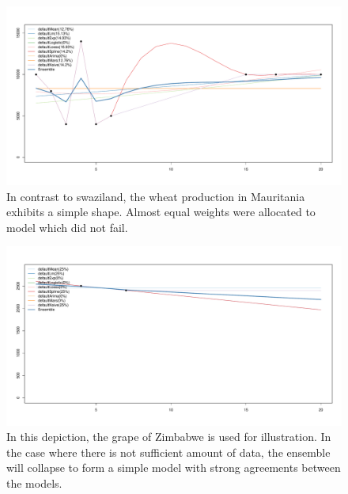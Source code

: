 \documentclass[nojss]{jss}\usepackage[]{graphicx}\usepackage[]{color}
\makeatletter
\def\maxwidth{ %
  \ifdim\Gin@nat@width>\linewidth
    \linewidth
  \else
    \Gin@nat@width
  \fi
}
\newenvironment{knitrout}{}{} %
\makeatother
\begin{document}
\begin{knitrout}
\color{fgcolor}\begin{figure}[!ht]


{\centering \includegraphics[width=\maxwidth]{figure/wheat-madagascar} 

}

\caption[In contrast to swaziland, the wheat production in Mauritania exhibits a simple shape]{In contrast to swaziland, the wheat production in Mauritania exhibits a simple shape. Almost equal weights were allocated to model which did not fail.\label{fig:wheat-madagascar}}
\end{figure}


\end{knitrout}


\begin{knitrout}
\color{fgcolor}\begin{figure}[!ht]


{\centering \includegraphics[width=\maxwidth]{figure/grape-zimbabwe} 

}

\caption[In this depiction, the grape of Zimbabwe is used for illustration]{In this depiction, the grape of Zimbabwe is used for illustration. In the case where there is not sufficient amount of data, the ensemble will collapse to form a simple model with strong agreements between the models.\label{fig:grape-zimbabwe}}
\end{figure}


\end{knitrout}
\end{document}
